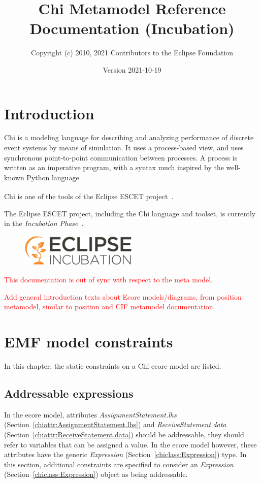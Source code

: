 \documentclass{report}
\title{Chi Metamodel Reference Documentation (Incubation)}
\author{Copyright (c) 2010, 2021 Contributors to the Eclipse Foundation}
\date{Version 2021-10-19}
\newcommand{\chiclass}[1]{\textit{#1} (Section~\ref{chiclass:#1})}
\newcommand{\chiattr}[1]{\textit{#1} (Section~\ref{chiattr:#1})}
\newcommand{\todo}[1]{\textcolor{red}{#1}}
\begin{document}
\maketitle
\tableofcontents

\chapter{Introduction}

Chi is a modeling language for describing and analyzing performance of
discrete event systems by means of simulation.
It uses a process-based view, and uses synchronous point-to-point
communication between processes. A process is written as an imperative
program, with a syntax much inspired by the well-known Python language.

Chi is one of the tools of the Eclipse ESCET\textsuperscript{\texttrademark{}}
project~\cite{Eclipse:ESCET}.

The Eclipse ESCET project, including the Chi language and toolset, is
currently in the \emph{Incubation Phase}~\cite{Eclipse:Incubation}.
\begin{figure}[H]
  \centering
  \includegraphics[width=0.5\textwidth]{figures/eclipse-incubation.png}
\end{figure}

\todo{This documentation is out of sync with respect to the meta model.}

\todo{Add general introduction texts about Ecore models/diagrams, from
position metamodel, similar to position and CIF metamodel documentation.}


\chapter{EMF model constraints}
In this chapter, the static constraints on a Chi ecore model are listed.

\section{Addressable expressions}\label{sect:addressable-expressions}
In the ecore model, attributes \chiattr{AssignmentStatement.lhs} and
\chiattr{ReceiveStatement.data} should be addressable, they should refer to
variables that can be assigned a value.
In the ecore model however, these attributes have the generic
\chiclass{Expression} type. In this section, additional constraints are
specified to consider an \chiclass{Expression} object as being addressable.
\end{document}
